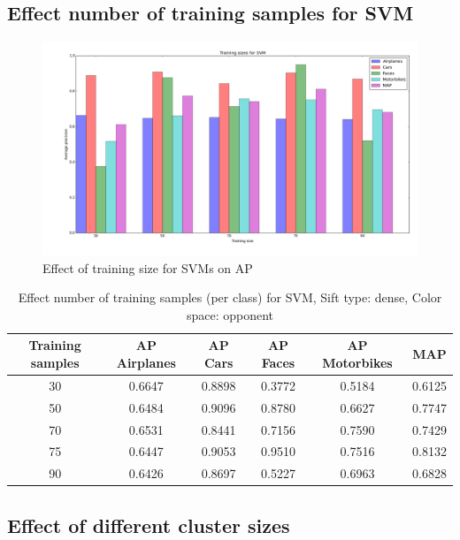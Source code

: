 \subsection{Effect number of training samples for SVM}
\begin{figure}[H]
\includegraphics[width=\textwidth]{plots/training_size_SVM}
\caption{Effect of training size for SVMs on AP}
\end{figure}

\begin{table}[H]
\begin{tabular}{|c|ccccc|}
\hline
\textbf{Training samples} & \textbf{AP Airplanes} & \textbf{AP Cars} & \textbf{AP Faces} & \textbf{AP Motorbikes} & \textbf{MAP}\\
\hline
30 & 0.6647 & 0.8898 & 0.3772 & 0.5184& 0.6125\\
50 & 0.6484 & 0.9096 & 0.8780 & 0.6627 & 0.7747\\
70 & 0.6531 & 0.8441 & 0.7156 & 0.7590 & 0.7429\\
75 & 0.6447 & 0.9053 & 0.9510 & 0.7516 & 0.8132\\
90 & 0.6426 & 0.8697 & 0.5227 & 0.6963 & 0.6828\\
\hline
\end{tabular}
\caption{Effect number of training samples (per class) for SVM, Sift type: dense, Color space: opponent}
\end{table}


\subsection{Effect of different cluster sizes}

